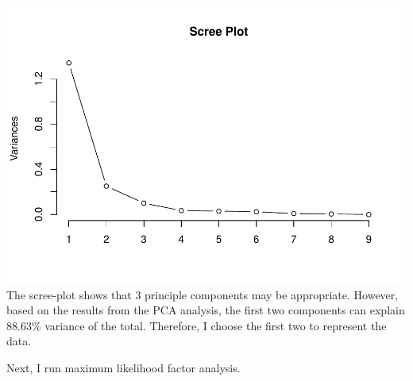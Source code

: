 \documentclass[
]{article}
\newenvironment{Shaded}{\begin{snugshade}}{\end{snugshade}}
\newcommand{\AttributeTok}[1]{\textcolor[rgb]{0.77,0.63,0.00}{#1}}
\newcommand{\CommentTok}[1]{\textcolor[rgb]{0.56,0.35,0.01}{\textit{#1}}}
\newcommand{\ControlFlowTok}[1]{\textcolor[rgb]{0.13,0.29,0.53}{\textbf{#1}}}
\newcommand{\DecValTok}[1]{\textcolor[rgb]{0.00,0.00,0.81}{#1}}
\newcommand{\ErrorTok}[1]{\textcolor[rgb]{0.64,0.00,0.00}{\textbf{#1}}}
\newcommand{\FunctionTok}[1]{\textcolor[rgb]{0.00,0.00,0.00}{#1}}
\newcommand{\NormalTok}[1]{#1}
\newcommand{\SpecialCharTok}[1]{\textcolor[rgb]{0.00,0.00,0.00}{#1}}
\newcommand{\StringTok}[1]{\textcolor[rgb]{0.31,0.60,0.02}{#1}}
\begin{document}
\includegraphics{HUDM6122-Homework_05-Chenguang-Pan_files/figure-latex/unnamed-chunk-14-1.pdf}
The scree-plot shows that 3 principle components may be appropriate.
However, based on the results from the PCA analysis, the first two
components can explain 88.63\% variance of the total. Therefore, I
choose the first two to represent the data.

Next, I run maximum likelihood factor analysis.

\begin{Shaded}
\end{Shaded}
\end{document}
